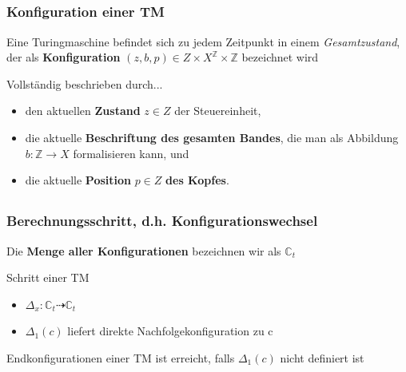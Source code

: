 \subsection*{}
\begin{frame}
  \frametitle{Konfiguration einer TM}
Eine Turingmaschine befindet sich zu jedem Zeitpunkt in einem \textit{Gesamtzustand}, der als \textbf{Konfiguration} $(z, b, p) \in Z \times X^\mathbb{Z} \times \mathbb{Z}$ bezeichnet wird
\begin{block}{Vollständig beschrieben durch...}
\begin{itemize}
  \pause
	\item den aktuellen \textbf{Zustand} $z \in Z$ der Steuereinheit,
	\pause
	\item die aktuelle \textbf{Beschriftung des gesamten Bandes}, die man als Abbildung $b: \mathbb{Z} \rightarrow X$ formalisieren kann, und
	\pause
	\item die aktuelle \textbf{Position} $p \in Z$ \textbf{des Kopfes}.
\end{itemize}
\end{block}
\end{frame}

\subsection*{}
\begin{frame}
  \frametitle{Berechnungsschritt, d.h. Konfigurationswechsel}
  \pause
  Die \textbf{Menge aller Konfigurationen} bezeichnen wir als $\mathbb{C}_t$
  \pause
  \begin{block}{Schritt einer TM}
\begin{itemize}
	\item   $\Delta_x : \mathbb{C}_t \dashrightarrow  \mathbb{C}_t$
  \item		$\Delta_1(c)$ liefert direkte Nachfolgekonfiguration zu c
\end{itemize}
  \end{block}
  \pause
    \begin{block}{Endkonfigurationen einer TM}
  ist erreicht, falls $\Delta_1(c)$ nicht definiert ist
  \end{block}
\end{frame}

